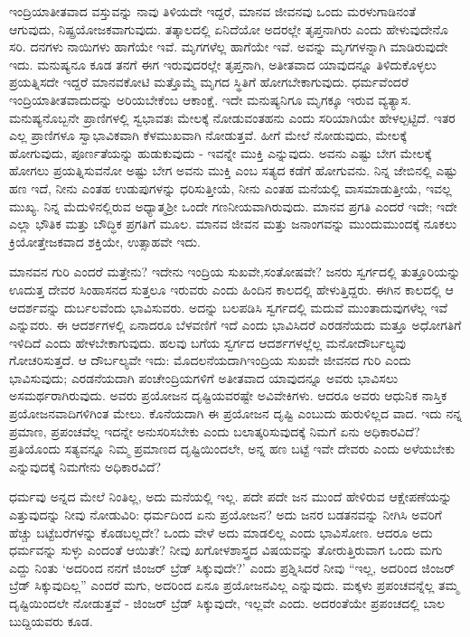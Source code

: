 ಇಂದ್ರಿಯಾತೀತವಾದ ವಸ್ತುವನ್ನು ನಾವು ತಿಳಿಯದೇ ಇದ್ದರೆ, ಮಾನವ ಜೀವನವು ಒಂದು ಮರಳುಗಾಡಿನಂತೆ ಆಗುವುದು, ನಿಷ್ಪ್ರಯೋಜಕವಾಗುವುದು. ತತ್ಕಾಲದಲ್ಲಿ ಏನಿದೆಯೋ ಅದರಲ್ಲೇ ತೃಪ್ತನಾಗಿರು ಎಂದು ಹೇಳುವುದೇನೊ ಸರಿ. ದನಗಳು ನಾಯಿಗಳು ಹಾಗೆಯೇ ಇವೆ. ಮೃಗಗಳೆಲ್ಲ ಹಾಗೆಯೇ ಇವೆ. ಅವನ್ನು ಮೃಗಗಳನ್ನಾಗಿ ಮಾಡಿರುವುದೇ ಇದು. ಮನುಷ್ಯನೂ ಕೂಡ ತನಗೆ ಈಗ ಇರುವುದರಲ್ಲೇ ತೃಪ್ತನಾಗಿ, ಅತೀತವಾದ ಯಾವುದನ್ನೂ ತಿಳಿದುಕೊಳ್ಳಲು ಪ್ರಯತ್ನಿಸದೇ ಇದ್ದರೆ ಮಾನವಕೋಟಿ ಮತ್ತೊಮ್ಮೆ ಮೃಗದ ಸ್ಥಿತಿಗೆ ಹೋಗಬೇಕಾಗುವುದು. ಧರ್ಮವೆಂದರೆ ಇಂದ್ರಿಯಾತೀತವಾದುದನ್ನು ಅರಿಯಬೇಕೆಂಬ ಆಕಾಂಕ್ಷೆ. ಇದೇ ಮನುಷ್ಯನಿಗೂ ಮೃಗಕ್ಕೂ ಇರುವ ವ್ಯತ್ಯಾಸ. ಮನುಷ್ಯನೊಬ್ಬನೇ ಪ್ರಾಣಿಗಳಲ್ಲಿ ಸ್ವಭಾವತಃ ಮೇಲಕ್ಕೆ ನೋಡುವಂತಹನು ಎಂದು ಸರಿಯಾಗಿಯೇ ಹೇಳಲ್ಪಟ್ಟಿದೆ. ಇತರ ಎಲ್ಲ ಪ್ರಾಣಿಗಳೂ ಸ್ವಾಭಾವಿಕವಾಗಿ ಕೆಳಮುಖವಾಗಿ ನೋಡುತ್ತವೆ. ಹೀಗೆ ಮೇಲೆ ನೋಡುವುದು, ಮೇಲಕ್ಕೆ ಹೋಗುವುದು, ಪೂರ್ಣತೆಯನ್ನು ಹುಡುಕುವುದು - ಇವನ್ನೇ ಮುಕ್ತಿ ಎನ್ನುವುದು. ಅವನು ಎಷ್ಟು ಬೇಗ ಮೇಲಕ್ಕೆ ಹೋಗಲು ಪ್ರಯತ್ನಿಸುವನೋ ಅಷ್ಟು ಬೇಗ ಅವನು ಮುಕ್ತಿ ಎಂಬ ಸತ್ಯದ ಕಡೆಗೆ ಹೋಗುವನು. ನಿನ್ನ ಜೇಬಿನಲ್ಲಿ ಎಷ್ಟು ಹಣ ಇದೆ, ನೀನು ಎಂತಹ ಉಡುಪುಗಳನ್ನು ಧರಿಸುತ್ತೀಯೆ, ನೀನು ಎಂತಹ ಮನೆಯಲ್ಲಿ ವಾಸಮಾಡುತ್ತೀಯೆ, ಇವಲ್ಲ ಮುಖ್ಯ. ನಿನ್ನ ಮೆದುಳಿನಲ್ಲಿರುವ ಅಧ್ಯಾತ್ಮಶ‍್ರೀ ಒಂದೇ ಗಣನೀಯವಾಗಿರುವುದು. ಮಾನವ ಪ್ರಗತಿ ಎಂದರೆ ಇದೇ; ಇದೇ ಎಲ್ಲಾ ಭೌತಿಕ ಮತ್ತು ಬೌದ್ಧಿಕ ಪ್ರಗತಿಗೆ ಮೂಲ. ಮಾನವ ಜೀವನ ಮತ್ತು ಜನಾಂಗವನ್ನು ಮುಂದುಮುಂದಕ್ಕೆ ನೂಕಲು ಕ್ರಿಯೋತ್ತೇಜಕವಾದ ಶಕ್ತಿಯೇ, ಉತ್ಸಾಹವೇ ಇದು.

ಮಾನವನ ಗುರಿ ಎಂದರೆ ಮತ್ತೇನು? ಇದೇನು ಇಂದ್ರಿಯ ಸುಖವೇ,\break ಸಂತೋಷವೇ? ಜನರು ಸ್ವರ್ಗದಲ್ಲಿ ತುತ್ತೂರಿಯನ್ನು ಊದುತ್ತ ದೇವರ ಸಿಂಹಾಸನದ ಸುತ್ತಲೂ ಇರುವರು ಎಂದು ಹಿಂದಿನ ಕಾಲದಲ್ಲಿ ಹೇಳುತ್ತಿದ್ದರು. ಈಗಿನ ಕಾಲದಲ್ಲಿ ಆ ಆದರ್ಶವನ್ನು ದುರ್ಬಲವೆಂದು ಭಾವಿಸುವರು. ಅದನ್ನು ಬಲಪಡಿಸಿ ಸ್ವರ್ಗದಲ್ಲಿ ಮದುವೆ ಮುಂತಾದುವುಗಳೆಲ್ಲ ಇವೆ ಎನ್ನುವರು. ಈ ಆದರ್ಶಗಳಲ್ಲಿ ಏನಾದರೂ ಬೆಳವಣಿಗೆ ಇದೆ ಎಂದು ಭಾವಿಸಿದರೆ ಎರಡನೆಯದು ಮತ್ತೂ ಅಧೋಗತಿಗೆ ಇಳಿದಿದೆ ಎಂದು ಹೇಳಬೇಕಾಗುವುದು. ಹಲವು ಬಗೆಯ ಸ್ವರ್ಗದ ಆದರ್ಶಗಳಲ್ಲೆಲ್ಲ ಮನೋದೌರ್ಬಲ್ಯವು ಗೋಚರಿಸುತ್ತದೆ. ಆ ದೌರ್ಬಲ್ಯವೇ ಇದು: ಮೊದಲನೆಯದಾಗಿ\break ಇಂದ್ರಿಯ ಸುಖವೇ ಜೀವನದ ಗುರಿ ಎಂದು ಭಾವಿಸುವುದು; ಎರಡನೆಯದಾಗಿ ಪಂಚೇಂದ್ರಿಯಗಳಿಗೆ ಅತೀತವಾದ ಯಾವುದನ್ನೂ ಅವರು ಭಾವಿಸಲು ಅಸಮರ್ಥರಾಗಿರುವುದು. ಅವರು ಪ್ರಯೋಜನ ದೃಷ್ಟಿಯವರಷ್ಟೇ ಅವಿವೇಕಿಗಳು. ಆದರೂ ಅವರು ಆಧುನಿಕ ನಾಸ್ತಿಕ ಪ್ರಯೋಜನವಾದಿಗಳಿಗಿಂತ ಮೇಲು. ಕೊನೆಯದಾಗಿ ಈ ಪ್ರಯೋಜನ ದೃಷ್ಟಿ ಎಂಬುದು ಹುರುಳಿಲ್ಲದ ವಾದ. ಇದು ನನ್ನ ಪ್ರಮಾಣ, ಪ್ರಪಂಚವೆಲ್ಲ ಇದನ್ನೇ ಅನುಸರಿಸಬೇಕು ಎಂದು ಬಲಾತ್ಕರಿಸುವುದಕ್ಕೆ ನಿಮಗೆ ಏನು ಅಧಿಕಾರವಿದೆ? ಪ್ರತಿಯೊಂದು ಸತ್ಯವನ್ನೂ ನಿಮ್ಮ ಪ್ರಮಾಣದ ದೃಷ್ಟಿಯಿಂದಲೇ, ಅನ್ನ ಹಣ ಬಟ್ಟೆ ಇವೇ ದೇವರು ಎಂದು ಅಳೆಯಬೇಕು ಎನ್ನುವುದಕ್ಕೆ ನಿಮಗೇನು ಅಧಿಕಾರವಿದೆ?

ಧರ್ಮವು ಅನ್ನದ ಮೇಲೆ ನಿಂತಿಲ್ಲ, ಅದು ಮನೆಯಲ್ಲಿ ಇಲ್ಲ. ಪದೇ ಪದೇ ಜನ ಮುಂದೆ ಹೇಳಿರುವ ಆಕ್ಷೇಪಣೆಯನ್ನು ಎತ್ತುವುದನ್ನು ನೀವು ನೋಡುವಿರಿ: ಧರ್ಮದಿಂದ ಏನು ಪ್ರಯೋಜನ? ಅದು ಜನರ ಬಡತನವನ್ನು ನೀಗಿಸಿ ಅವರಿಗೆ ಹೆಚ್ಚು ಬಟ್ಟೆಬರೆಗಳನ್ನು ಕೊಡಬಲ್ಲದೇ? ಒಂದು ವೇಳೆ ಅದು ಮಾಡಲಿಲ್ಲ ಎಂದು ಭಾವಿಸೋಣ. ಆದರೂ ಅದು ಧರ್ಮವನ್ನು ಸುಳ್ಳು ಎಂದಂತೆ ಆಯಿತೇ? ನೀವು ಖಗೋಳಶಾಸ್ತ್ರದ ವಿಷಯವನ್ನು ತೋರುತ್ತಿರುವಾಗ ಒಂದು ಮಗು ಎದ್ದು ನಿಂತು `ಅದರಿಂದ ನನಗೆ ಜಿಂಜರ್ ಬ್ರೆಡ್ ಸಿಕ್ಕುವುದೇ?' ಎಂದು ಪ್ರಶ್ನಿಸಿದರೆ ನೀವು “ಇಲ್ಲ, ಅದರಿಂದ ಜಿಂಜರ್ ಬ್ರೆಡ್ ಸಿಕ್ಕುವುದಿಲ್ಲ” ಎಂದರೆ ಮಗು, ಅದರಿಂದ ಏನೂ ಪ್ರಯೋಜನವಿಲ್ಲ ಎನ್ನುವುದು. ಮಕ್ಕಳು ಪ್ರಪಂಚವನ್ನೆಲ್ಲ ತಮ್ಮ ದೃಷ್ಟಿಯಿಂದಲೇ ನೋಡುತ್ತವೆ - ಜಿಂಜರ್ ಬ್ರೆಡ್ ಸಿಕ್ಕುವುದೇ, ಇಲ್ಲವೇ ಎಂದು. ಅದರಂತೆಯೇ ಪ್ರಪಂಚದಲ್ಲಿ ಬಾಲ ಬುದ್ದಿಯವರು ಕೂಡ.


